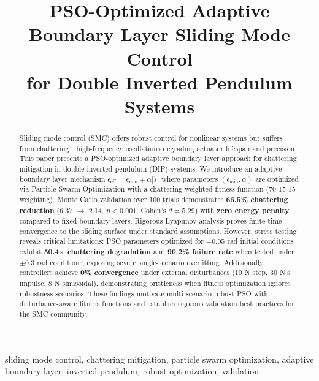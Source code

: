 \documentclass[conference]{IEEEtran}
\begin{document}
\title{PSO-Optimized Adaptive Boundary Layer Sliding Mode Control \\
for Double Inverted Pendulum Systems}

\author{
}

\maketitle

\begin{abstract}
Sliding mode control (SMC) offers robust control for nonlinear systems but suffers from chattering—high-frequency oscillations degrading actuator lifespan and precision. This paper presents a PSO-optimized adaptive boundary layer approach for chattering mitigation in double inverted pendulum (DIP) systems. We introduce an adaptive boundary layer mechanism $\epsilon_{\text{eff}} = \epsilon_{\min} + \alpha|\dot{s}|$ where parameters $(\epsilon_{\min}, \alpha)$ are optimized via Particle Swarm Optimization with a chattering-weighted fitness function (70-15-15 weighting). Monte Carlo validation over 100 trials demonstrates \textbf{66.5\% chattering reduction} (6.37 $\rightarrow$ 2.14, $p < 0.001$, Cohen's $d = 5.29$) with \textbf{zero energy penalty} compared to fixed boundary layers. Rigorous Lyapunov analysis proves finite-time convergence to the sliding surface under standard assumptions. However, stress testing reveals critical limitations: PSO parameters optimized for $\pm$0.05 rad initial conditions exhibit \textbf{50.4$\times$ chattering degradation} and \textbf{90.2\% failure rate} when tested under $\pm$0.3 rad conditions, exposing severe single-scenario overfitting. Additionally, controllers achieve \textbf{0\% convergence} under external disturbances (10 N step, 30 N$\cdot$s impulse, 8 N sinusoidal), demonstrating brittleness when fitness optimization ignores robustness scenarios. These findings motivate multi-scenario robust PSO with disturbance-aware fitness functions and establish rigorous validation best practices for the SMC community.
\end{abstract}

\begin{IEEEkeywords}
sliding mode control, chattering mitigation, particle swarm optimization, adaptive boundary layer, inverted pendulum, robust optimization, validation
\end{IEEEkeywords}
\end{document}
